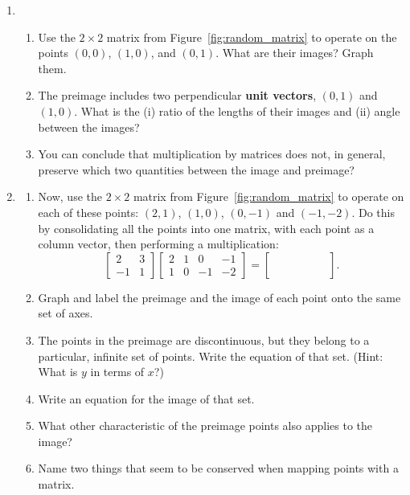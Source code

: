 \documentclass[../gatm.tex]{subfiles}
\begin{document}
\begin{enumerate}
\item \begin{enumerate}
\item Use the $2\times 2$ matrix from Figure~\ref{fig:random_matrix} to operate on the points $(0,0)$, $(1,0)$, and $(0,1)$. What are their images? Graph them.
\item The preimage includes two perpendicular \textbf{unit vectors}, $(0,1)$ and $(1,0)$. What is the (i) ratio of the lengths of their images and (ii) angle between the images?
\item You can conclude that multiplication by matrices does not, in general, preserve which two quantities between the image and preimage?
\end{enumerate}
\item \label{prob:consolidate_matrix} \begin{enumerate}
\item Now, use the $2\times 2$ matrix from Figure~\ref{fig:random_matrix} to operate on each of these points: $(2,1)$, $(1,0)$, $(0,-1)$ and $(-1,-2)$. Do this by consolidating all the points into one matrix, with each point as a column vector, then performing a multiplication:
$$\left[\begin{array}{cc}2 & 3 \\ -1 & 1 \end{array}\right]
\left[\begin{array}{cccc}2 & 1 & 0 & -1 \\ 1 & 0 & -1 & -2\end{array}\right]
=\left[\begin{array}{cccc}\phantom{0} & \phantom{0} & \phantom{0} & \phantom{0} \\ \phantom{0}\end{array}\right].$$
\item Graph and label the preimage and the image of each point onto the same set of axes.
\item The points in the preimage are discontinuous, but they belong to a particular, infinite set of points. Write the equation of that set. (Hint: What is $y$ in terms of $x$?)
\item Write an equation for the image of that set.
\item What other characteristic of the preimage points also applies to the image?
\item Name two things that seem to be conserved when mapping points with a matrix.
\end{enumerate}
\setcounter{mp_problem_i}{\value{enumi}}
\end{enumerate}
\end{document}
